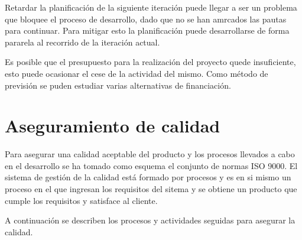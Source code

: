 Retardar la planificación de la siguiente iteración puede llegar a ser un problema que bloquee el proceso de desarrollo, dado que no se han amrcados las pautas para 
continuar. Para mitigar esto la planificación puede desarrollarse de forma pararela al recorrido de la iteración actual. 

Es posible que el presupuesto para la realización del proyecto quede insuficiente, esto puede ocasionar el cese de la actividad del mismo. Como método de previsión se 
puden estudiar varias alternativas de financiación.  

\section{Aseguramiento de calidad}

Para asegurar una calidad aceptable del producto y los procesos llevados a cabo en el desarrollo se ha tomado como esquema el conjunto de normas ISO 9000. 
El sistema de gestión de la calidad está formado por procesos y es en si mismo un proceso en el que ingresan los requisitos del sitema y se obtiene un
producto que cumple los requisitos y satisface al cliente. 

A continuación se describen los procesos y actividades seguidas para asegurar la calidad.

